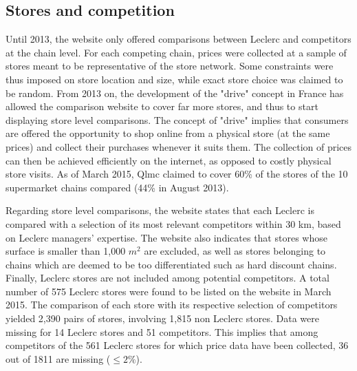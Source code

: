 \documentclass[english]{article}
\begin{document}
\subsection{Stores and competition}

Until 2013, the website only offered comparisons between Leclerc and competitors at the chain level. For each competing chain, prices were collected at a sample of stores meant to be representative of the store network. Some constraints were thus imposed on store location and size, while exact store choice was claimed to be random. From 2013 on, the development of the "drive" concept in France has allowed the comparison website to cover far more stores, and thus to start displaying store level comparisons. The concept of "drive" implies that consumers are offered the opportunity to shop online from a physical store (at the same prices) and collect their purchases whenever it suits them. The collection of prices can then be achieved efficiently on the internet, as opposed to costly physical store visits. As of March 2015, Qlmc claimed to cover 60\% of the stores of the 10 supermarket chains compared (44\% in August 2013).

Regarding store level comparisons, the website states that each Leclerc is compared with a selection of its most relevant competitors within 30 km, based on Leclerc managers' expertise. The website also indicates that stores whose surface is smaller than 1,000 $m^2$ are excluded, as well as stores belonging to chains which are deemed to be too differentiated such as hard discount chains. Finally, Leclerc stores are not included among potential competitors. A total number of 575 Leclerc stores were found to be listed on the website in March 2015. The comparison of each store with its respective selection of competitors yielded 2,390 pairs of stores, involving 1,815 non Leclerc stores. Data were missing for 14 Leclerc stores and 51 competitors. This implies that among competitors of the 561 Leclerc stores for which price data have been collected, 36 out of 1811 are missing ($\le 2 \%$).
\end{document}
